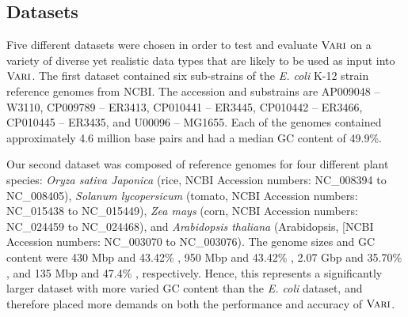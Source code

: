 \subsection{Datasets} \label{data}

Five different datasets were chosen in order to test and evaluate $\mbox{\rm {\sc Vari}}$ on a variety of diverse yet realistic data types that are likely to be used as input into $\mbox{\rm {\sc Vari}}$.  The first dataset contained six sub-strains of the {\em E. coli} K-12 strain reference genomes from NCBI.  The accession and substrains are 	AP009048 -- W3110,  
	CP009789 -- ER3413, 
	CP010441 -- ER3445, 
	CP010442 -- ER3466, 
	CP010445 -- ER3435, and 
	U00096   -- MG1655. 
    Each of the genomes contained approximately 4.6 million base pairs and had a median GC content of 49.9\%.



    

Our second dataset was composed of reference genomes for four different plant species: \emph{Oryza sativa Japonica} (rice, NCBI Accession numbers: NC\_008394 to NC\_008405), \emph{Solanum lycopersicum} (tomato, NCBI Accession numbers: NC\_015438 to NC\_015449),  \emph{Zea mays} (corn, NCBI Accession numbers: NC\_024459 to NC\_024468), and  \emph{Arabidopsis thaliana} (Arabidopsis, [NCBI Accession numbers: NC\_003070 to NC\_003076).  The genome sizes and GC content were 430 Mbp and 43.42\% \citep{rice}, 950 Mbp and 43.42\% \citep{tomato1,tomato2}, 2.07 Gbp and 35.70\% \citep{corn}, and 135 Mbp and 47.4\% \citep{swarbreck}, respectively.  Hence, this represents a significantly larger dataset with more varied GC content than the {\em E. coli} dataset, and therefore placed more demands on both the performance and accuracy of $\mbox{\rm {\sc Vari}}$.  


